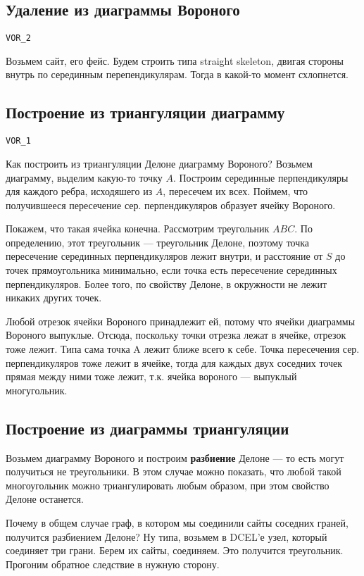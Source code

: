 \documentclass[11pt]{article}
\begin{document}
\subsection{Удаление из диаграммы Вороного}
\label{sec-24-2}
\verb~VOR_2~

Возьмем сайт, его фейс. Будем строить типа straight skeleton,
двигая стороны внутрь по серединным перепендикулярам. Тогда в
какой-то момент схлопнется.
\subsection{Построение из триангуляции диаграмму}
\label{sec-24-3}
\verb~VOR_1~

Как построить из триангуляции Делоне диаграмму Вороного?  Возьмем
диаграмму, выделим какую-то точку $A$. Построим серединные
перпендикуляры для каждого ребра, исходяшего из $A$, пересечем их
всех. Поймем, что получившееся пересечение сер. перпендикуляров
образует ячейку Вороного.

Покажем, что такая ячейка конечна. Рассмотрим треугольник $ABC$. По
определению, этот треугольник --- треугольник Делоне, поэтому точка
пересечение серединных перпендикуляров лежит внутри, и расстояние
от $S$ до точек прямоугольника минимально, если точка есть
пересечение серединных перпендикуляров. Более того, по свойству
Делоне, в окружности не лежит никаких других точек.

Любой отрезок ячейки Вороного принадлежит ей, потому что ячейки
диаграммы Вороного выпуклые. Отсюда, поскольку точки отрезка лежат в
ячейке, отрезок тоже лежит. Типа сама точка A лежит ближе всего к
себе. Точка пересечения сер. перпендикуляров тоже лежит в ячейке,
тогда для каждых двух соседних точек прямая между ними тоже лежит,
т.к. ячейка вороного --- выпуклый многугольник.
\subsection{Построение из диаграммы триангуляции}
\label{sec-24-4}
Возьмем диаграмму Вороного и построим \textbf{разбиение} Делоне --- то есть
могут получиться не треугольники. В этом случае можно показать, что
любой такой многоугольник можно триангулировать любым образом, при
этом свойство Делоне останется.

Почему в общем случае граф, в котором мы соединили сайты соседних
граней, получится разбиением Делоне? Ну типа, возьмем в DCEL'е
узел, который соединяет три грани. Берем их сайты, соединяем. Это
получится треугольник. Прогоним обратное следствие в нужную
сторону.
\end{document}
